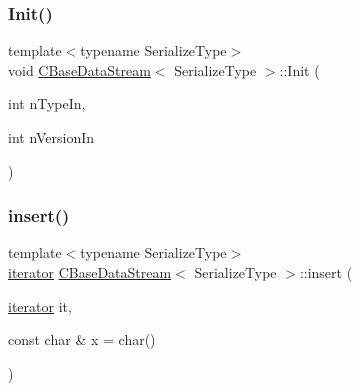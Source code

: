 \mbox{\label{class_c_base_data_stream_a2d828ad342dacde5b5feae046702fb53}} 
\subsubsection{\texorpdfstring{Init()}{Init()}}
{\footnotesize\ttfamily template$<$typename Serialize\+Type$>$ \\
void \mbox{\hyperlink{class_c_base_data_stream}{C\+Base\+Data\+Stream}}$<$ Serialize\+Type $>$\+::Init (\begin{DoxyParamCaption}\item[{int}]{n\+Type\+In,  }\item[{int}]{n\+Version\+In }\end{DoxyParamCaption})\hspace{0.3cm}{\ttfamily [inline]}}

\mbox{\label{class_c_base_data_stream_aab96f99c03e7cb36e8345701e49707c9}} 
\subsubsection{\texorpdfstring{insert()}{insert()}\hspace{0.1cm}{\footnotesize\ttfamily [1/4]}}
{\footnotesize\ttfamily template$<$typename Serialize\+Type$>$ \\
\mbox{\hyperlink{class_c_base_data_stream_a23e0e0af1c68dd36c27162036b6d048d}{iterator}} \mbox{\hyperlink{class_c_base_data_stream}{C\+Base\+Data\+Stream}}$<$ Serialize\+Type $>$\+::insert (\begin{DoxyParamCaption}\item[{\mbox{\hyperlink{class_c_base_data_stream_a23e0e0af1c68dd36c27162036b6d048d}{iterator}}}]{it,  }\item[{const char \&}]{x = {\ttfamily char()} }\end{DoxyParamCaption})\hspace{0.3cm}{\ttfamily [inline]}}

\mbox{\label{class_c_base_data_stream_a8f3b322d3e3a7e254f4a1a08cf3db187}} 
